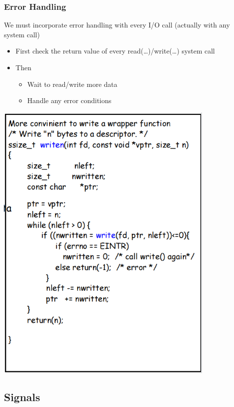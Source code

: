 \documentclass[12pt]{article}
\begin{document}
\subsubsection{Error Handling}
We must incorporate error handling with every I/O call (actually with any system call)
\begin{itemize}
    \item First check the return value of every read(…)/write(…) system call
    \item Then \begin{itemize}
        \item Wait to read/write more data
        \item Handle any error conditions
    \end{itemize}
\end{itemize}
\includegraphics[width=0.8\textwidth]{PipeErrorHandling.png}

\subsection{Signals}
\end{document}
